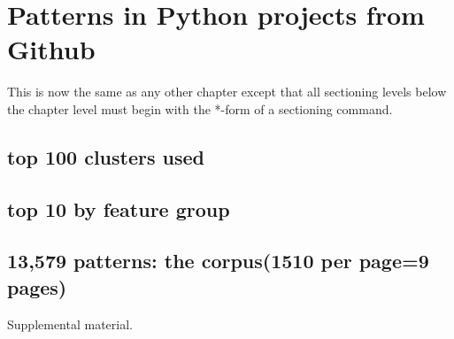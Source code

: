 \appendixtitle
\appendix
\chapter{Patterns in Python projects from Github}

This is now the same as any other chapter except that
all sectioning levels below the chapter level must begin
with the *-form of a sectioning command.

\section*{top 100 clusters used}

\section*{top 10 by feature group}

\section*{13,579 patterns: the corpus(1510 per page=9 pages)}

Supplemental material.

